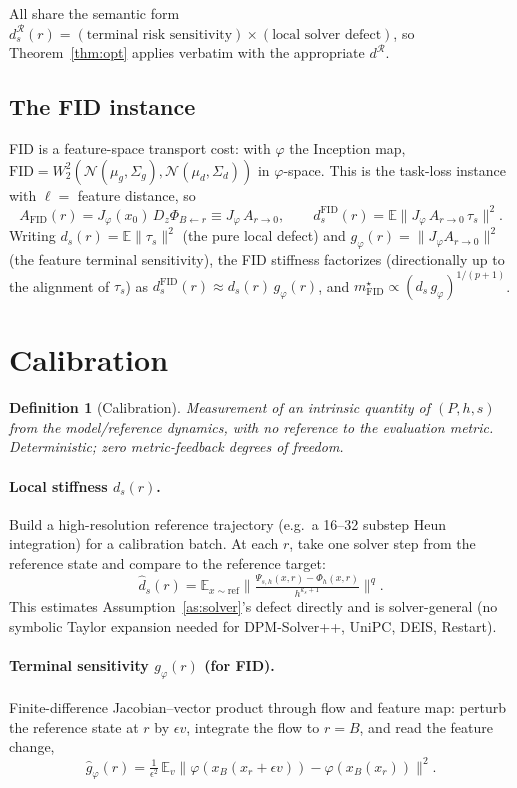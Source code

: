 \documentclass[11pt]{article}
\newtheorem{definition}{Definition}
\newcommand{\R}{\mathcal R}
\newcommand{\E}{\mathbb E}
\newcommand{\norm}[1]{\lVert #1 \rVert}
\begin{document}
\noindent All share the semantic form
$d^\R_s(r)=(\text{terminal risk sensitivity})\times(\text{local solver defect})$,
so Theorem~\ref{thm:opt} applies verbatim with the appropriate $d^\R$.

\subsection{The FID instance}
\label{sec:fid}
FID is a feature-space transport cost: with $\varphi$ the Inception map,
$\mathrm{FID}=W_2^2(\mathcal N(\mu_g,\Sigma_g),\mathcal N(\mu_d,\Sigma_d))$
in $\varphi$-space. This is the task-loss instance with
$\ell=$ feature distance, so
\[
A_{\mathrm{FID}}(r)=J_\varphi(x_0)\,D_z\Phi_{B\leftarrow r}\equiv J_\varphi\,A_{r\to0},
\qquad
d^{\mathrm{FID}}_s(r)=\E\big\|J_\varphi\,A_{r\to0}\,\tau_s\big\|^2 .
\]
Writing $d_s(r)=\E\norm{\tau_s}^2$ (the pure local defect) and
$g_\varphi(r)=\norm{J_\varphi A_{r\to 0}}^2$ (the feature terminal
sensitivity), the FID stiffness factorizes (directionally up to the
alignment of $\tau_s$) as $d^{\mathrm{FID}}_s(r)\approx d_s(r)\,g_\varphi(r)$,
and $m^\star_{\mathrm{FID}}\propto (d_s\,g_\varphi)^{1/(p+1)}$.

\section{Calibration}
\label{sec:calibration}

\begin{definition}[Calibration]
Measurement of an intrinsic quantity of $(P,h,s)$ from the model/reference
dynamics, with \emph{no} reference to the evaluation metric. Deterministic;
zero metric-feedback degrees of freedom.
\end{definition}

\paragraph{Local stiffness $d_s(r)$.}
Build a high-resolution reference trajectory (e.g.\ a 16--32 substep Heun
integration) for a calibration batch. At each $r$, take one solver step
from the reference state and compare to the reference target:
\[
\hat d_s(r)=\E_{x\sim\text{ref}}\Big\|\tfrac{\Psi_{s,h}(x,r)-\Phi_h(x,r)}{h^{k_s+1}}\Big\|^q .
\]
This estimates Assumption~\ref{as:solver}'s defect directly and is
solver-general (no symbolic Taylor expansion needed for DPM-Solver++,
UniPC, DEIS, Restart).

\paragraph{Terminal sensitivity $g_\varphi(r)$ (for FID).}
Finite-difference Jacobian--vector product through flow and feature map:
perturb the reference state at $r$ by $\epsilon v$, integrate the flow to
$r=B$, and read the feature change,
\[
\hat g_\varphi(r)=\tfrac{1}{\epsilon^2}\,\E_v\big\|\varphi(x_B(x_r+\epsilon v))-\varphi(x_B(x_r))\big\|^2 .
\]
\end{document}
